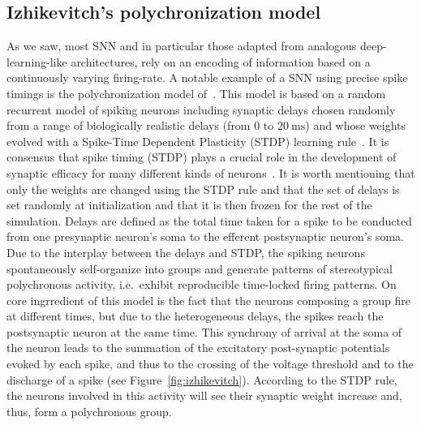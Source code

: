 \documentclass[brainsci, %
               review,submit,pdftex,moreauthors
               ]{Definitions/mdpi}
\newcommand{\ms}{\si{\milli\second}}%
\begin{document}
\subsection{Izhikevitch's polychronization model}
As we saw, most SNN and in particular those adapted from analogous deep-learning-like architectures, rely on an encoding of information based on a continuously varying firing-rate. A notable example of a SNN using precise spike timings is the polychronization model of~\citet{izhikevich_polychronization_2006}. This model is based on a random recurrent model of spiking neurons including synaptic delays chosen randomly from a range of biologically realistic delays (from $0$ to $20~\ms$) and whose weights evolved with a Spike-Time Dependent Plasticity (STDP) learning rule~\citep{markram_regulation_1997}. It is consensus that spike timing (STDP) plays a crucial role in the development of synaptic efficacy for many different kinds of neurons~\citep{caporale_spike_2008}. It is worth mentioning that only the weights are changed using the STDP rule and that the set of delays is set randomly at initialization and that it is then frozen for the rest of the simulation. Delays are defined as the total time taken for a spike to be conducted from one presynaptic neuron's soma to the efferent postsynaptic neuron's soma. Due to the interplay between the delays and STDP, the spiking neurons spontaneously self-organize into groups and generate patterns of stereotypical polychronous activity, i.e.~exhibit reproducible time-locked firing patterns. On core ingrredient of this model is the fact that the neurons composing a group fire at different times, but due to the heterogeneous delays, the spikes reach the postsynaptic neuron at the same time. This synchrony of arrival at the soma of the neuron leads to the summation of the excitatory post-synaptic potentials evoked by each spike, and thus to the crossing of the voltage threshold and to the discharge of a spike (see Figure~\ref{fig:izhikevitch}). According to the STDP rule, the neurons involved in this activity will see their synaptic weight increase and, thus, form a polychronous group. %
%
\end{document}
